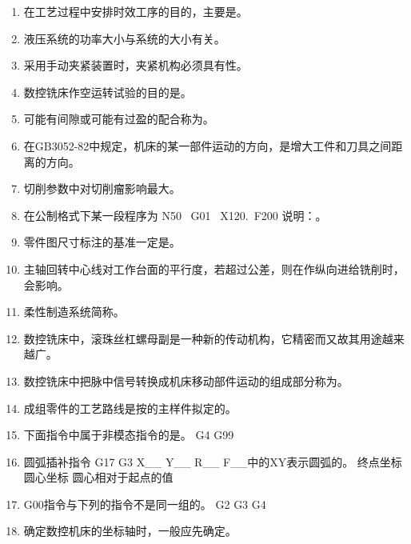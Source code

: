 \documentclass[12pt,twocolumn,landscape,UTF8,twoside]{ctexart}
\begin{document}
\begin{spacing}{1.089}
\begin{enumerate} [1、]
%
\item 在工艺过程中安排时效工序的目的，主要是。
%
\item 液压系统的功率大小与系统的大小有关。
%
\item 采用手动夹紧装置时，夹紧机构必须具有性。
%
\item 数控铣床作空运转试验的目的是。
%
\item 可能有间隙或可能有过盈的配合称为。
%
\item 在GB3052-82中规定，机床的某一部件运动的方向，是增大工件和刀具之间距离的方向。
%
\item 切削参数中对切削瘤影响最大。
%
\item 在公制格式下某一段程序为 N50 ~G01~ X120.~F200  说明：。
%
\item 零件图尺寸标注的基准一定是。
%
\item 主轴回转中心线对工作台面的平行度，若超过公差，则在作纵向进给铣削时，会影响。
%
\item 柔性制造系统简称。
%
\item 数控铣床中，滚珠丝杠螺母副是一种新的传动机构，它精密而又故其用途越来越广。
%
\item 数控铣床中把脉中信号转换成机床移动部件运动的组成部分称为。
%
\item 成组零件的工艺路线是按的主样件拟定的。
%
\item 下面指令中属于非模态指令的是。
	{G4}	{G99}
%
\item 圆弧插补指令 G17 G3 X\_\_ Y\_\_ R\_\_ F\_\_中的XY表示圆弧的。
	{终点坐标}	{圆心坐标}	{圆心相对于起点的值}
%
\item G00指令与下列的指令不是同一组的。
		{G2}	{G3}	{G4}
%
\item 确定数控机床的坐标轴时，一般应先确定。

\end{enumerate}
\end{spacing}
\end{document}
